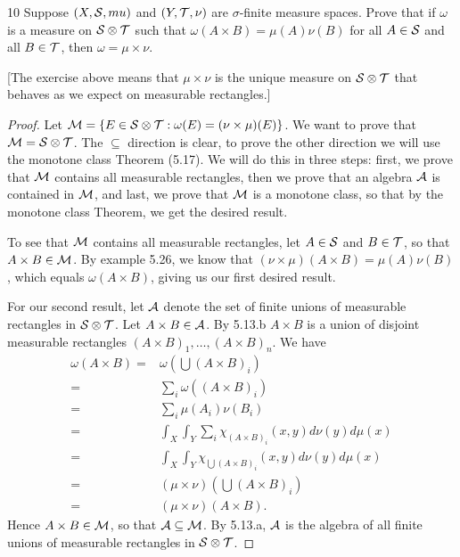\begin{exercise}{10}
Suppose $(X, \mathcal{S}, mu)$ and $(Y, \mathcal{T}, \nu)$ are $\sigma$-finite measure spaces.
Prove that if $\omega$ is a measure on $\mathcal{S} \otimes \mathcal{T}$ such that $\omega(A \times B) = \mu(A) \nu(B)$ for all $A \in \mathcal{S}$ and all $B \in \mathcal{T}$, then $\omega = \mu \times \nu$.

[The exercise above means that $\mu \times \nu$ is the unique measure on $\mathcal{S} \otimes \mathcal{T}$ that behaves as we expect on measurable rectangles.]
\end{exercise}
\begin{proof}
Let $\mathcal{M} = \{E \in \mathcal{S} \otimes \mathcal{T}: \omega(E) = (\nu \times \mu)(E)\}$.
We want to prove that $\mathcal{M} = \mathcal{S} \otimes \mathcal{T}$.
The $\subseteq$ direction is clear, to prove the other direction we will use the monotone class Theorem (5.17).
We will do this in three steps:
first, we prove that $\mathcal{M}$ contains all measurable rectangles, then we prove that an algebra $\mathcal{A}$ is contained in $\mathcal{M}$, and last, we prove that $\mathcal{M}$ is a monotone class, so that by the monotone class Theorem, we get the desired result.

To see that $\mathcal{M}$ contains all measurable rectangles, let $A \in \mathcal{S}$ and $B \in \mathcal{T}$, so that $A \times B \in \mathcal{M}$.
By example 5.26, we know that $(\nu \times \mu)(A \times B) = \mu(A)\nu(B)$, which equals $\omega(A \times B)$, giving us our first desired result.

For our second result, let $\mathcal{A}$ denote the set of finite unions of measurable rectangles in $\mathcal{S} \otimes \mathcal{T}$.
Let $A \times B \in \mathcal{A}$.
By 5.13.b $A \times B$ is a union of disjoint measurable rectangles $(A \times B)_1, \dots, (A \times B)_n$.
We have
\begin{align*}
    \omega(A \times B) 
    =& \omega (\bigcup (A \times B)_i)\\
    =& \sum_i \omega((A \times B)_i)\\
    =& \sum_i \mu(A_i) \nu(B_i)\\
    =& \int_X \int_Y \sum_i \chi_{(A \times B)_i}(x, y) d\nu(y) d\mu(x)\\
    =& \int_X \int_Y \chi_{\bigcup (A \times B)_i}(x, y) d\nu(y) d\mu(x)\\
    =& (\mu \times \nu)(\bigcup (A \times B)_i)\\
    =& (\mu \times \nu)(A \times B).
\end{align*}
Hence $A \times B \in \mathcal{M}$, so that $\mathcal{A} \subseteq \mathcal{M}$.
By 5.13.a, $\mathcal{A}$ is the algebra of all finite unions of measurable rectangles in $\mathcal{S} \otimes \mathcal{T}$.


\end{proof}
